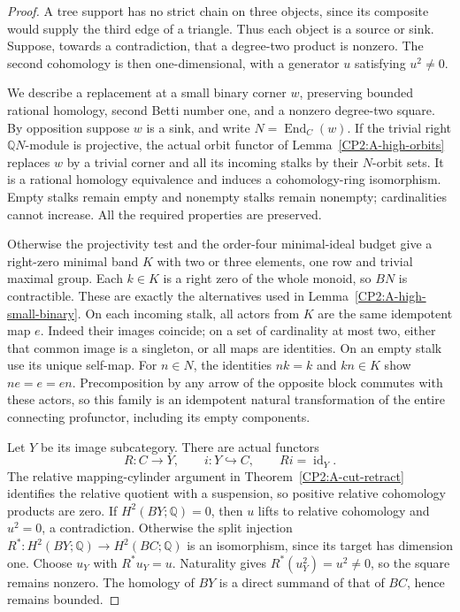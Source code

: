 \begin{proof}
A tree support has no strict chain on three objects,
since its composite would supply the third edge of a
triangle. Thus each object is a source or sink.
Suppose, towards a contradiction, that a degree-two
product is nonzero. The second cohomology is then
one-dimensional, with a generator $u$ satisfying
$u^2\ne0$.

We describe a replacement at a small binary corner $w$,
preserving bounded rational homology, second Betti number
one, and a nonzero degree-two square. By opposition
suppose $w$ is a sink, and write $N=\operatorname{End}_C(w)$.
If the trivial right $\mathbb QN$-module is projective,
the actual orbit functor of
Lemma~\ref{CP2:A-high-orbits} replaces $w$ by a trivial
corner and all its incoming stalks by their $N$-orbit
sets. It is a rational homology equivalence and induces
a cohomology-ring isomorphism. Empty stalks remain empty
and nonempty stalks remain nonempty; cardinalities cannot
increase. All the required properties are preserved.

Otherwise the projectivity test and the order-four
minimal-ideal budget give a right-zero minimal band
$K$ with two or three elements, one row and trivial
maximal group. Each $k\in K$ is a right zero of the
whole monoid, so $BN$ is contractible. These are exactly
the alternatives used in
Lemma~\ref{CP2:A-high-small-binary}.
On each incoming stalk, all actors from $K$ are the
same idempotent map $e$. Indeed their images coincide;
on a set of cardinality at most two, either that common
image is a singleton, or all maps are identities.
On an empty stalk use its unique self-map. For $n\in N$,
the identities $nk=k$ and $kn\in K$ show
$ne=e=en$. Precomposition by any arrow of the opposite
block commutes with these actors, so this family is an
idempotent natural transformation of the entire connecting
profunctor, including its empty components.

Let $Y$ be its image subcategory. There are actual functors
\[
 R:C\longrightarrow Y,\qquad i:Y\hookrightarrow C,
 \qquad Ri=\operatorname{id}_Y.
\]
The relative mapping-cylinder argument in
Theorem~\ref{CP2:A-cut-retract} identifies the relative
quotient with a suspension, so positive relative
cohomology products are zero. If $H^2(BY;\mathbb Q)=0$,
then $u$ lifts to relative cohomology and $u^2=0$,
a contradiction. Otherwise the split injection
$R^*:H^2(BY;\mathbb Q)\to H^2(BC;\mathbb Q)$ is an
isomorphism, since its target has dimension one.
Choose $u_Y$ with $R^*u_Y=u$. Naturality gives
$R^*(u_Y^2)=u^2\ne0$, so the square remains nonzero.
The homology of $BY$ is a direct summand of that of
$BC$, hence remains bounded.


\end{proof}
